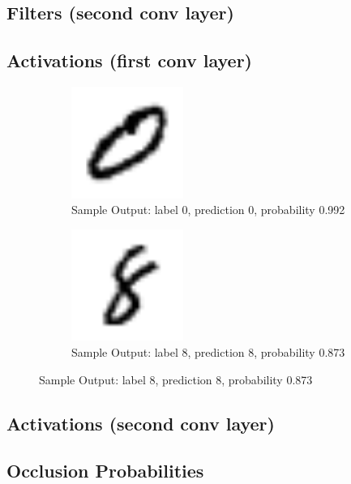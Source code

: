 \subsection{Filters (second conv layer)}

\subsection{Activations (first conv layer)}
\begin{figure}[h]
\begin{subfigure}
\centering
\includegraphics[angle=0,width=0.4\textwidth]{assign-2/logs/0.png}
\caption{Sample Output: label 0, prediction 0, probability 0.992}
\end{subfigure}
\begin{subfigure}
\centering
\includegraphics[angle=0,width=0.4\textwidth]{assign-2/logs/8.png}
\caption{Sample Output: label 8, prediction 8, probability 0.873}
\end{subfigure}
\end{figure}

\subsection{Activations (second conv layer)}


\subsection{Occlusion Probabilities}


